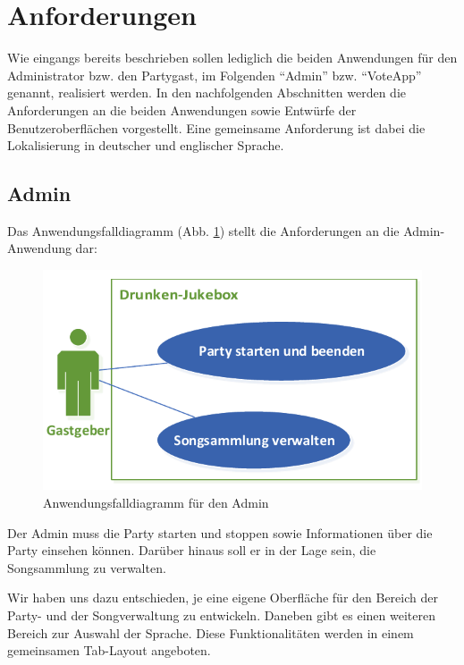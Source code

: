\newpage
\section{Anforderungen}
\label{sec:Anforderungen}
Wie eingangs bereits beschrieben sollen lediglich die beiden Anwendungen für den Administrator bzw. den Partygast, im Folgenden "`Admin"' bzw. "`VoteApp"' genannt, realisiert werden. In den nachfolgenden Abschnitten werden die Anforderungen an die beiden Anwendungen sowie Entwürfe der Benutzeroberflächen vorgestellt. Eine gemeinsame Anforderung ist dabei die Lokalisierung in deutscher und englischer Sprache.

\subsection{Admin}
Das Anwendungsfalldiagramm (Abb. \ref{fig:AdminUseCase}) stellt die Anforderungen an die Admin-Anwendung dar:

\begin{figure}[H]
\centering
\includegraphics[width=0.7\linewidth]{Bilder/AdminUseCase}
\caption{Anwendungsfalldiagramm für den Admin\protect\footnotemark}
\label{fig:AdminUseCase}
\end{figure}

Der Admin muss die Party starten und stoppen sowie Informationen über die Party einsehen können. Darüber hinaus soll er in der Lage sein, die Songsammlung zu verwalten.

Wir haben uns dazu entschieden, je eine eigene Oberfläche für den Bereich der Party- und der Songverwaltung zu entwickeln. Daneben gibt es einen weiteren Bereich zur Auswahl der Sprache. Diese Funktionalitäten werden in einem gemeinsamen Tab-Layout angeboten.
  
